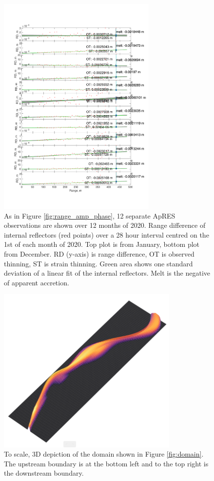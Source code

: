 \begin{figure}[!ht]
\centering
\includegraphics[width=0.7\textwidth]{chapters/3/12strains.pdf}
\caption[Monthly strain]{As in Figure \ref{fig:range_amp_phase}, 12 separate ApRES observations are shown over 12 months of 2020. Range difference of internal reflectors (red points) over a 28 hour interval centred on the 1st of each month of 2020.  Top plot is from January, bottom plot from December.  RD (y-axis) is range difference, OT is observed thinning, ST is strain thinning. Green area shows one standard deviation of a linear fit of the internal reflectors. Melt is the negative of apparent accretion.
}
\label{fig:12strains}
\end{figure}

\begin{figure}[!ht]
\centering
\includegraphics[width=0.8\textwidth]{chapters/4/3d_domain.png}
\caption[3D domain]{To scale, 3D depiction of the domain shown in Figure \ref{fig:domain}.  The upstream boundary is at the bottom left and to the top right is the downstream boundary.}
\label{fig:3d_domain}
\end{figure}